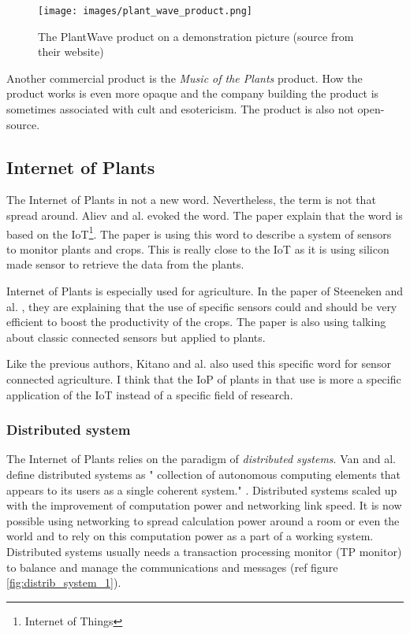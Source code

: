 \begin{figure}[h!]
    \centering
    \texttt{[image: images/plant\_wave\_product.png]}
    \caption{The PlantWave product on a demonstration picture (source from their website)}
    \vspace{0.1cm}
    \label{fig:plant_wave_product}
\end{figure}

Another commercial product is the \textit{Music of the Plants} product. How the product works is even more opaque and the company building the product
is sometimes associated with cult and esotericism. The product is also not open-source.


\subsection{Internet of Plants}

The Internet of Plants in not a new word. Nevertheless, the term is not that spread around. Aliev and al. \cite{alievInternetPlantsApplication2018} evoked the word. The paper explain that the word is based on the IoT\footnote{Internet of Things}. The paper is using this word to describe a system of sensors to monitor plants and crops. This is really close to the IoT as it is using silicon made sensor to retrieve the data from the plants.

Internet of Plants is especially used for agriculture. In the paper of Steeneken and al. \cite{steenekenSensorsAgricultureInternet2023}, they are explaining that the use of specific sensors could and should be very efficient to boost the productivity of the crops.
The paper is also using talking about classic connected sensors but applied to plants.

Like the previous authors, Kitano and al. \cite{kitanoInternetPlantsIoP2022} also used this specific word for sensor connected agriculture. I think that the IoP of plants in that use is more a specific application of the IoT instead of a specific field of research.

\subsubsection{Distributed system}

The Internet of Plants relies on the paradigm of \textit{distributed systems}. Van and al. define distributed systems as " collection of autonomous computing elements that appears to its users as a single coherent system." \cite{steenDistributedSystems2017}.
Distributed systems scaled up with the improvement of computation power and networking link speed. It is now possible using networking to spread calculation power around a room or even the world and to rely on this computation power as a part of a working system. Distributed systems usually needs a transaction processing monitor (TP monitor) to balance and manage the communications and messages (ref figure \ref{fig:distrib_system_1}).

